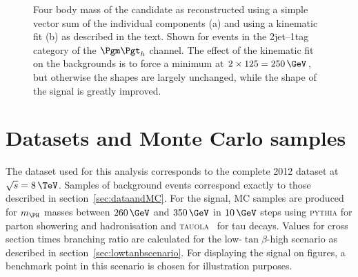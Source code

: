 \begin{figure}
\begin{center}

\end{center}
\caption[Four body mass of the candidate \PH in data and MC events reconstructed
with and without a kinematic fit.]{
Four body mass of the candidate \PH as reconstructed using a simple vector sum of the
individual components (a) and using a kinematic fit (b) as
described in the text. Shown for events in the 2jet--1tag category of the
$\mutau$ channel. The effect of the kinematic fit on the backgrounds is to force
a minimum at $2\times125=250\,\GeV$, but otherwise the shapes are largely
unchanged, while the shape of the signal is greatly improved.}
\label{fig:kinfitvsmttbbstacked}
\end{figure} 

\section{Datasets and Monte Carlo samples}
\label{sec:Hhhdatasets}

The dataset used for this analysis corresponds to the complete 2012 dataset at
$\sqrt{s}=8\,\TeV$. Samples of background events correspond exactly to those
described in section~\ref{sec:dataandMC}. For the signal, \ac{MC} samples are
produced for $m_{\PH}$ masses between $260\,\GeV$ and $350\,\GeV$ in $10\,\GeV$
steps using \textsc{pythia}
for parton showering and hadronisation and \textsc{tauola}~\cite{TAUOLA} for tau
decays. Values for cross section times branching ratio are calculated for the
low-$\tan\beta$-high scenario as described in section~\ref{sec:lowtanbscenario}.
For displaying the signal on figures, a benchmark point in this scenario is
chosen for illustration purposes.

